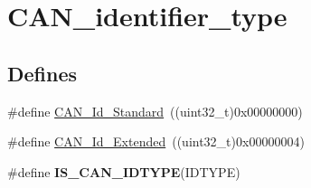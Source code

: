 \hypertarget{group__CAN__identifier__type}{
\section{CAN\_\-identifier\_\-type}
\label{group__CAN__identifier__type}
}
\subsection*{Defines}
\begin{DoxyCompactItemize}
\item 
\#define \hyperlink{group__CAN__identifier__type_ga151d9df8a6f361d0a3231593726b5a13}{CAN\_\-Id\_\-Standard}~((uint32\_\-t)0x00000000)
\item 
\#define \hyperlink{group__CAN__identifier__type_gaf6c5c0b43b968fed17fd90246912b1a7}{CAN\_\-Id\_\-Extended}~((uint32\_\-t)0x00000004)
\item 
\#define {\bfseries IS\_\-CAN\_\-IDTYPE}(IDTYPE)
\end{DoxyCompactItemize}


